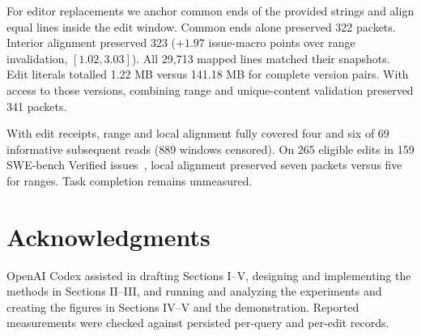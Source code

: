\documentclass[conference]{IEEEtran}
\begin{document}
For editor replacements we anchor common ends of the provided strings and align equal lines inside the edit window. Common ends alone preserved 322 packets. Interior alignment preserved 323 ($+1.97$ issue-macro points over range invalidation, $[1.02,3.03]$). All 29,713 mapped lines matched their snapshots. Edit literals totalled 1.22 MB versus 141.18 MB for complete version pairs. With access to those versions, combining range and unique-content validation preserved 341 packets.

With edit receipts, range and local alignment fully covered four and six of 69 informative subsequent reads (889 windows censored). On 265 eligible edits in 159 SWE-bench Verified issues~\cite{swe-run}, local alignment preserved seven packets versus five for ranges. Task completion remains unmeasured.



\section*{Acknowledgments}
OpenAI Codex assisted in drafting Sections I--V, designing and implementing the methods in Sections II--III, and running and analyzing the experiments and creating the figures in Sections IV--V and the demonstration. Reported measurements were checked against persisted per-query and per-edit records.



\end{document}
